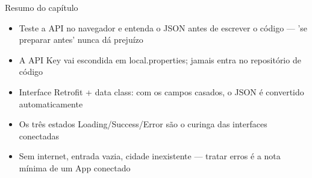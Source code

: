 \begin{tcbsummary}{Resumo do capítulo}
\begin{itemize}
  \item Teste a API no navegador e entenda o JSON antes de escrever o código — 'se preparar antes' nunca dá prejuízo
  \item A API Key vai escondida em local.properties; jamais entra no repositório de código
  \item Interface Retrofit + data class: com os campos casados, o JSON é convertido automaticamente
  \item Os três estados Loading/Success/Error são o curinga das interfaces conectadas
  \item Sem internet, entrada vazia, cidade inexistente — tratar erros é a nota mínima de um App conectado
\end{itemize}

\end{tcbsummary}
